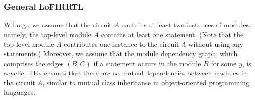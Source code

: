 \subsubsection{General LoFIRRTL}
W.l.o.g., we assume that the circuit $A$ contains at least two instances of modules, namely,
the top-level module $A$ contains at least one  statement.
(Note that the top-level module $A$ contributes one instance to the circuit $A$ without using any  statements.)
Moreover, we assume that the module dependency graph, which comprises the edges $(B, C)$ if a statement  occurs in
the module $B$ for some $y$, is acyclic.
This ensures that there are no mutual dependencies between modules in the circuit $A$,
similar to mutual class inheritance in object-oriented programming languages.

